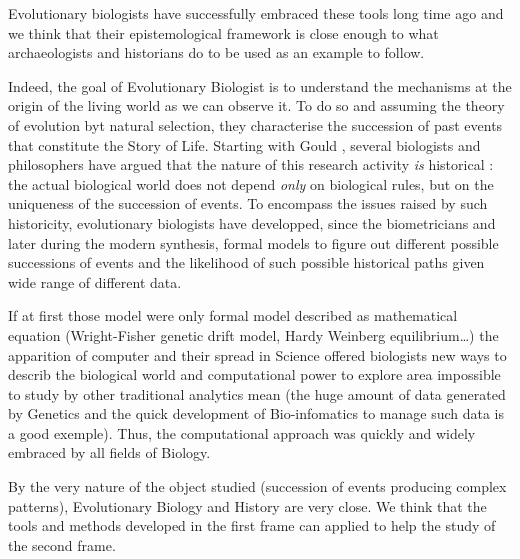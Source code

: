\documentclass[a4paper]{article}
\begin{document}
Evolutionary biologists have successfully embraced these tools long time ago and we think that their epistemological framework is close enough to what archaeologists and historians do to be used as an example to follow. 

Indeed, the goal of Evolutionary Biologist is to understand the mechanisms at the origin of the living world as we can observe it. To do so and assuming the theory of evolution byt natural selection, they characterise the succession of past events that constitute the Story of Life. Starting with Gould \cite{gould1989wonderfullife}, several biologists and philosophers have argued that the nature of this research activity \emph{is} historical \cite{beatty1995evolutionary}: the actual biological world does not depend \emph{only} on biological rules, but on the uniqueness of the succession of events. To encompass the issues raised by such historicity, evolutionary biologists have developped, since the biometricians and later during the modern synthesis, formal models to figure out different possible successions of events and the likelihood of such possible historical paths given wide range of different data. 

If at first those model were only formal model described as mathematical equation (Wright-Fisher genetic drift model, Hardy Weinberg equilibrium\ldots) the apparition of computer and their spread in Science offered biologists new ways to describ the biological world and computational power to explore area impossible to study by other traditional analytics mean (the huge amount of data generated by Genetics and the quick development of Bio-infomatics to manage such data is a good exemple). Thus, the computational approach was quickly and widely embraced by all fields of Biology.
 
By the very nature of the object studied (succession of events producing complex patterns), Evolutionary Biology and History are very close. We think that the tools and methods developed in the first frame can applied to help the study of the second frame.
\end{document}

